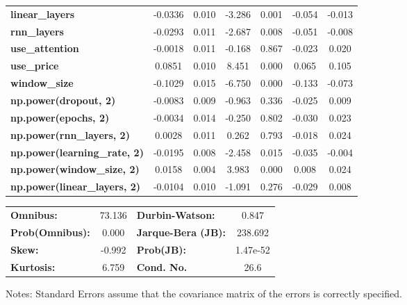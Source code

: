 \begin{center}
\begin{tabular}{lcccccc}
\textbf{linear\_layers}              &      -0.0336  &        0.010     &    -3.286  &         0.001        &       -0.054    &       -0.013     \\
\textbf{rnn\_layers}                 &      -0.0293  &        0.011     &    -2.687  &         0.008        &       -0.051    &       -0.008     \\
\textbf{use\_attention}              &      -0.0018  &        0.011     &    -0.168  &         0.867        &       -0.023    &        0.020     \\
\textbf{use\_price}                  &       0.0851  &        0.010     &     8.451  &         0.000        &        0.065    &        0.105     \\
\textbf{window\_size}                &      -0.1029  &        0.015     &    -6.750  &         0.000        &       -0.133    &       -0.073     \\
\textbf{np.power(dropout, 2)}        &      -0.0083  &        0.009     &    -0.963  &         0.336        &       -0.025    &        0.009     \\
\textbf{np.power(epochs, 2)}         &      -0.0034  &        0.014     &    -0.250  &         0.802        &       -0.030    &        0.023     \\
\textbf{np.power(rnn\_layers, 2)}    &       0.0028  &        0.011     &     0.262  &         0.793        &       -0.018    &        0.024     \\
\textbf{np.power(learning\_rate, 2)} &      -0.0195  &        0.008     &    -2.458  &         0.015        &       -0.035    &       -0.004     \\
\textbf{np.power(window\_size, 2)}   &       0.0158  &        0.004     &     3.983  &         0.000        &        0.008    &        0.024     \\
\textbf{np.power(linear\_layers, 2)} &      -0.0104  &        0.010     &    -1.091  &         0.276        &       -0.029    &        0.008     \\
\bottomrule
\end{tabular}
\begin{tabular}{lclc}
\textbf{Omnibus:}       & 73.136 & \textbf{  Durbin-Watson:     } &    0.847  \\
\textbf{Prob(Omnibus):} &  0.000 & \textbf{  Jarque-Bera (JB):  } &  238.692  \\
\textbf{Skew:}          & -0.992 & \textbf{  Prob(JB):          } & 1.47e-52  \\
\textbf{Kurtosis:}      &  6.759 & \textbf{  Cond. No.          } &     26.6  \\
\bottomrule
\end{tabular}
\end{center}

Notes: \newline
 [1] Standard Errors assume that the covariance matrix of the errors is correctly specified.